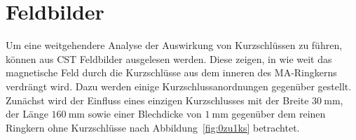 \section{Feldbilder}
Um eine weitgehendere Analyse der Auswirkung von Kurzschl\"ussen zu f\"uhren, k\"onnen aus CST Feldbilder ausgelesen werden. Diese zeigen, in wie weit das magnetische Feld durch die Kurzschl\"usse aus dem inneren des MA-Ringkerns verdr\"angt wird. Dazu werden einige Kurzschlussanordnungen gegen\"uber gestellt. Zun\"achst wird der Einfluss eines einzigen Kurzschlusses mit der Breite $\SI{30}{\milli\meter}$, der Länge $\SI{160}{\milli\meter}$ sowie einer Blechdicke von $\SI{1}{\milli\meter}$ gegen\"uber dem reinen Ringkern ohne Kurzschl\"usse nach Abbildung~\ref{fig:0zu1ks} betrachtet.


\newpage




